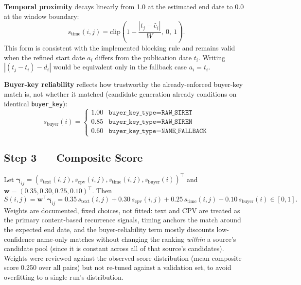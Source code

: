 \documentclass[11pt]{article}
\begin{document}
\textbf{Temporal proximity} decays linearly from 1.0 at the estimated end
date to 0.0 at the window boundary:
\begin{equation}
s_{\text{time}}(i,j) = \mathrm{clip}\!\left(1 - \frac{|t_j-\hat e_i|}{W},\ 0,\ 1\right).
\end{equation}
This form is consistent with the implemented blocking rule and remains valid
when the refined start date $a_i$ differs from the publication date $t_i$.
Writing $|(t_j-t_i)-d_i|$ would be equivalent only in the fallback case
$a_i=t_i$.

\textbf{Buyer-key reliability} reflects how trustworthy the
already-enforced buyer-key match is, not whether it matched (candidate
generation already conditions on identical \texttt{buyer\_key}):
\begin{equation}
s_{\text{buyer}}(i) =
\begin{cases}
1.00 & \texttt{buyer\_key\_type} = \texttt{RAW\_SIRET} \\
0.85 & \texttt{buyer\_key\_type} = \texttt{RAW\_SIREN} \\
0.60 & \texttt{buyer\_key\_type} = \texttt{NAME\_FALLBACK}
\end{cases}
\end{equation}

\subsection{Step 3 --- Composite Score}
Let
$\boldsymbol\gamma_{ij}=(s_{\text{text}}(i,j),s_{\text{cpv}}(i,j),
s_{\text{time}}(i,j),s_{\text{buyer}}(i))^{\top}$ and
$\boldsymbol w=(0.35,0.30,0.25,0.10)^{\top}$. Then
\begin{equation}
S(i,j)=\boldsymbol w^{\top}\boldsymbol\gamma_{ij}
=0.35\,s_{\text{text}}(i,j)+0.30\,s_{\text{cpv}}(i,j)
+0.25\,s_{\text{time}}(i,j)+0.10\,s_{\text{buyer}}(i)\in[0,1].
\end{equation}
Weights are documented, fixed choices, not fitted: text and CPV are treated
as the primary content-based recurrence signals, timing anchors the match
around the expected end date, and the buyer-reliability term mostly
discounts low-confidence name-only matches without changing the ranking
\emph{within} a source's candidate pool (since it is constant across all of
that source's candidates). Weights were reviewed against the observed score
distribution (mean composite score 0.250 over all pairs) but not re-tuned
against a validation set, to avoid overfitting to a single run's
distribution.
\end{document}
